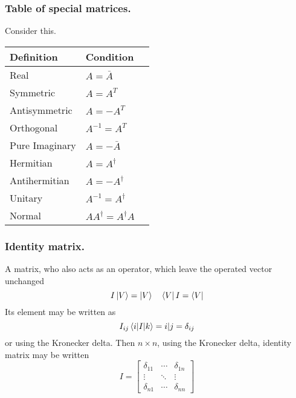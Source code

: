 \documentclass[../main.tex]{subfiles}
\begin{document}
\subsubsection*{Table of special matrices.} Consider this.

\begin{table}[h]
	\centering
	\begin{tabular}{@{}llr@{}}
		\toprule
		Definition     & Condition                   \\
		\midrule
		Real           & $A=\bar{A}$                 \\
		Symmetric      & $A=A^T$                     \\
		Antisymmetric  & $A=-A^T$                    \\
		Orthogonal     & $A^{-1}=A^T$                \\
		Pure Imaginary & $A=-\bar{A}$                \\
		Hermitian      & $A=A^{\dagger}$             \\
		Antihermitian  & $A=-A^{\dagger}$            \\
		Unitary        & $A^{-1}=A^{\dagger}$        \\
		Normal         & $AA^{\dagger}=A^{\dagger}A$ \\
		\bottomrule
	\end{tabular}
\end{table}

\subsubsection*{Identity matrix.}
A matrix, who also acts as an operator, which leave the operated vector unchanged
\begin{equation*}
	I \ket{V}=\ket{V}\quad \bra{V}I=\bra{V}
\end{equation*}
Its element may be written as
\begin{equation*}
	I_{ij} \braket{i|I|k}={i|j}=\delta_{ij}
\end{equation*}
or using the Kronecker delta.
Then $n\times n$, using the Kronecker delta, identity matrix may be written
\begin{equation*}
	I = \begin{bmatrix}
		\delta_{11} & \cdots & \delta_{1n} \\
		\vdots      & \ddots & \vdots      \\
		\delta_{n1} & \cdots & \delta_{nn}
	\end{bmatrix}
\end{equation*}
\end{document}
